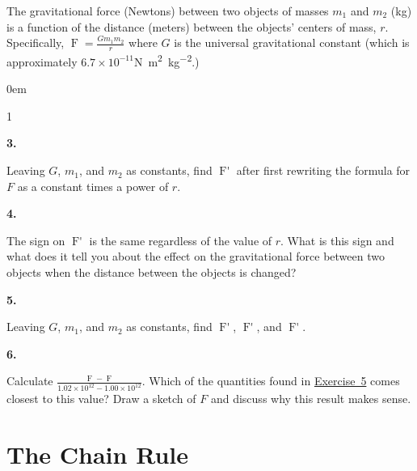 \documentclass[12pt,]{book}
\theoremstyle{plain}
\theoremstyle{definition}
\numberwithin{equation}{section}
\newenvironment{exercisegroup}%
{\medskip\noindent}%
{\par\bigskip}%
\newlength{\exercisegroupindent}%
\newlength{\exercisegroupitemwidth}%
\newenvironment{exercisegrouplist}%
{\vspace{-\partopsep}%
\begin{adjustwidth}{\exercisegroupindent}{0em}}%
{\end{adjustwidth}%
\vspace{-\partopsep}%
\vspace{\baselineskip}}%
\newenvironment{exercisegroupbycol}[1]%
{\begin{exercisegrouplist}%
\vspace{-\multicolsep}%
\begin{multicols}{#1}%
\setlength{\parindent}{0em}%
\setlength{\exercisegroupitemwidth}{\linewidth}}%
{\end{multicols}%
\vspace{-\multicolsep}%
\end{exercisegrouplist}}%
\newenvironment{exercisegroupitem}[1]%
{\begin{minipage}[t]{\exercisegroupitemwidth}
\vspace{0pt}%
{\bfseries#1}%
\rule{0pt}{\baselineskip}}{\strut%
\end{minipage}%
\hspace{\columnsep}}%
\providecommand\phantomsection{}
\newcommand{\fe}[2]{\mathop{{#1}{\left(#2\right)}}}
\newcommand{\fd}[1]{#1'}
\begin{document}
\begin{exercisegroup}%
The gravitational force (Newtons) between two objects of masses \(m_1\) and \(m_2\) (\si{\kilo\gram}) is a function of the distance (meters) between the objects' centers of mass, \(r\).    Specifically, \(\fe{F}{r}=\frac{Gm_1m_2}{r}\) where \(G\) is the universal gravitational constant (which is approximately \(6.7\times10^{-11}\)\si{\newton\meter\tothe{2}\per\kilo\gram\tothe{2}}.)%
\begin{exercisegroupbycol}{1}%
\begin{exercisegroupitem}{3. }\phantomsection\hypertarget{exercise-276}{\null}
Leaving \(G\), \(m_1\), and \(m_2\) as constants, find \(\fe{\fd{F}}{r}\) after first rewriting the formula for \(F\) as a constant times a power of \(r\).%
\end{exercisegroupitem}%
\par%
\begin{exercisegroupitem}{4. }\phantomsection\hypertarget{exercise-277}{\null}
The sign on \(\fe{\fd{F}}{r}\) is the same regardless of the value of \(r\).  What is this sign and what does it tell you about the effect on the gravitational force between two objects when the distance between the objects is changed?%
\end{exercisegroupitem}%
\par%
\begin{exercisegroupitem}{5. }\phantomsection\hypertarget{exercise-evaluate-gravity}{\null}
Leaving \(G\), \(m_1\), and \(m_2\) as constants, find \(\fe{\fd{F}}{1.00\times10^{12}}\), \(\fe{\fd{F}}{1.01\times10^{12}}\), and \(\fe{\fd{F}}{1.02\times10^{12}}\).%
\end{exercisegroupitem}%
\par%
\begin{exercisegroupitem}{6. }\phantomsection\hypertarget{exercise-279}{\null}
Calculate \(\frac{\fe{F}{1.02\times10^{12}}-\fe{F}{1.00\times10^{12}}}{1.02\times10^{12}-1.00\times10^{12}}\). Which of the quantities found in \hyperref[exercise-evaluate-gravity]{Exercise~5} comes closest to this value?  Draw a sketch of \(F\) and discuss why this result makes sense.%
\end{exercisegroupitem}%
\par%
\end{exercisegroupbycol}%
\end{exercisegroup}%
\typeout{************************************************}
\typeout{************************************************}
\chapter[The Chain Rule]{The Chain Rule}\label{chapter-chain-rule}
\typeout{************************************************}
\typeout{************************************************}
\end{document}
